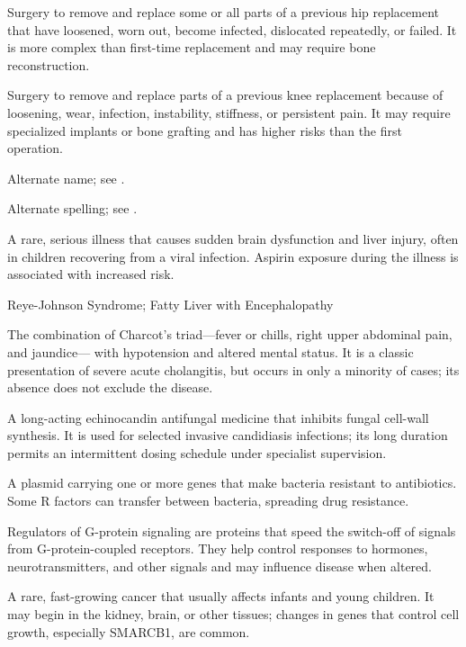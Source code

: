  Surgery to remove and replace some or all parts of a previous hip replacement that have loosened, worn out, become infected, dislocated repeatedly, or failed. It is more complex than first-time replacement and may require bone reconstruction.

 Surgery to remove and replace parts of a previous knee replacement because of loosening, wear, infection, instability, stiffness, or persistent pain. It may require specialized implants or bone grafting and has higher risks than the first operation.

 Alternate name; see .

 Alternate spelling; see .

 A rare, serious illness that causes sudden brain dysfunction and liver injury, often in children recovering from a viral infection. Aspirin exposure during the illness is associated with increased risk.

\synonyms
Reye-Johnson Syndrome; Fatty Liver with Encephalopathy

 The combination of Charcot's triad—fever or chills, right upper abdominal pain, and jaundice—
with hypotension and altered mental status. It is a classic presentation of severe acute cholangitis,
but occurs in only a minority of cases; its absence does not exclude the disease.

 A long-acting echinocandin antifungal medicine that inhibits fungal cell-wall synthesis. It is used for selected invasive
candidiasis infections; its long duration permits an intermittent dosing schedule under
specialist supervision.

 A plasmid carrying one or more genes that make bacteria resistant to antibiotics. Some R factors can transfer between bacteria, spreading drug resistance.

 Regulators of G-protein signaling are proteins that speed the switch-off of signals from G-protein-coupled receptors. They help control responses to hormones, neurotransmitters, and other signals and may influence disease when altered.

 A rare, fast-growing cancer that usually affects infants and young children. It may begin in the kidney, brain, or other tissues; changes in genes that control cell growth, especially SMARCB1, are common.

